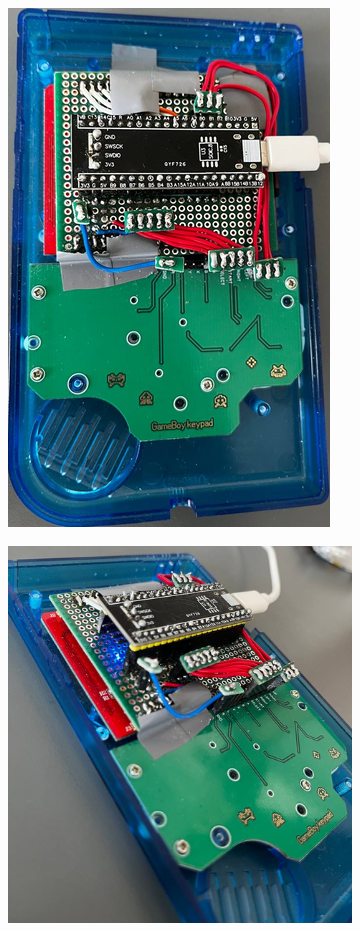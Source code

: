 \documentclass[hidelinks,12pt]{article}
\begin{document}
\begin{figure}[h]
	\begin{center}
		\begin{subfigure}[b]{0.4\textwidth}
			\begin{center}
				\includegraphics[scale=0.45]{figures/pcb_front.png}
			\end{center}
			\caption{}
			\label{fig:pcb_front}
		\end{subfigure}
		\hfill
		\begin{subfigure}[b]{0.4\textwidth}
			\begin{center}
				\includegraphics[scale=0.4]{figures/pcb_side.png}

\end{center}
\end{subfigure}
\end{center}
\end{figure}
\end{document}
